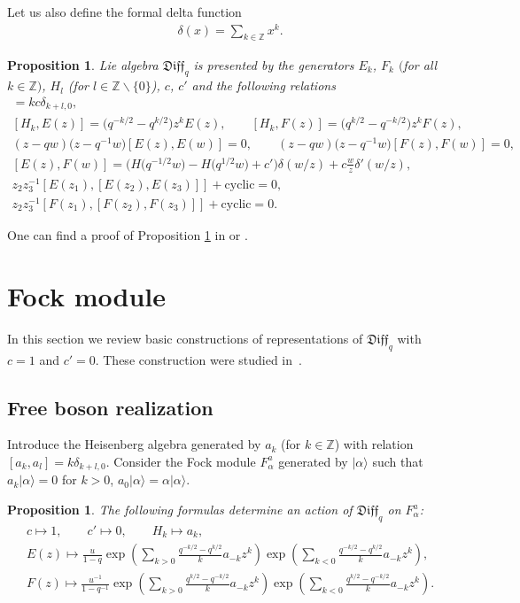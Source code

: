 \documentclass[11pt]{article}
\numberwithin{equation}{section}
\newtheorem{Proposition}[Theorem]{Proposition}
\theoremstyle{definition}
\newcommand{\qD}{\mathfrak{Diff}_q}
\begin{document}
Let us also define the formal delta function
\begin{gather*}
\delta(x) = \sum_{k \in \mathbb{Z}} x^k.
\end{gather*}
\begin{Proposition}\label{relation} Lie algebra $\qD$ is presented by the generators $E_k$, $F_k$ $($for all $k \in \mathbb{Z})$, $H_l$ {\upshape(}for $l \in \mathbb{Z} \backslash \{0 \}${\upshape)}, $c$, $c'$ and the following relations
\begin{gather}
[H_k, H_l] = k c \delta_{k+l, 0}, \label{RqDHH} \\
[H_k , E(z)] = \big(q^{-k/2}-q^{k/2}\big)z^k E(z), \qquad
[H_k, F(z)]= \big(q^{k/2}-q^{-k/2}\big) z^k F(z), \label{RqDHE-F} \\
(z-qw)\big(z-q^{-1} w\big) [E(z), E(w)]= 0, \qquad
(z-qw)\big(z-q^{-1} w\big) [F(z), F(w)]= 0 , \label{RqDE2} \\
[ E (z) , F (w)] = \big( H\big( q^{-1/2} w \big) - H\big(q^{1/2} w\big) + c'\big) \delta( w / z ) + c \frac{w}{z} \delta'(w/ z),\label{RqDEF} \\
z_2 z_3^{-1} [E(z_1), [E(z_2), E(z_3)]] + \mathrm{cyclic} =0, \label{RqDEEE} \\
z_2 z_3^{-1} [F(z_1), [F(z_2), F(z_3)]] + \mathrm{cyclic} =0. \label{RqDFFF}
\end{gather}
\end{Proposition}
One can find a proof of Proposition \ref{relation} in \cite[Theorem~2.1]{M07} or \cite[Theorem~5.5]{Ts}.

\section{Fock module} \label{level1}
In this section we review basic constructions of representations of $\qD$ with $c=1$ and $c'=0$. These construction were studied in~\cite{GL}.

\subsection{Free boson realization} \label{boson}

Introduce the Heisenberg algebra generated by $a_k$ (for $k \in \mathbb{Z}$) with relation $[a_k, a_l] = k \delta_{k+l, 0}$. Consider the Fock module $F_{\alpha}^a$ generated by $| \alpha \rangle$ such that $a_k | \alpha \rangle = 0$ for $k > 0$, $a_0 | \alpha \rangle = \alpha | \alpha \rangle$.
\begin{Proposition} \label{prop:sec3 Boson Fock}
The following formulas
determine an action of $\qD$ on $F_{\alpha}^a$:
\begin{gather}
c \mapsto 1, \qquad c' \mapsto 0, \qquad H_k \mapsto a_k, \label{boson1}\\
E(z) \mapsto \frac{u}{1-q} \exp \left( \sum_{k>0} \frac{q^{-k/2}-q^{k/2}}{k} a_{-k} z^k \right) \exp \left( \sum_{k<0} \frac{q^{-k/2}-q^{k/2}}{k} a_{-k} z^k \right) \label{eq:E},\\
F(z) \mapsto \frac{u^{-1}}{1-q^{-1}} \exp \left( \sum_{k>0} \frac{q^{k/2}-q^{-k/2}}{k} a_{-k} z^k \right) \exp \left( \sum_{k<0}\frac{q^{k/2}-q^{-k/2}}{k} a_{-k} z^k \right). \label{eq:F}
\end{gather}
\end{Proposition}
\end{document}

